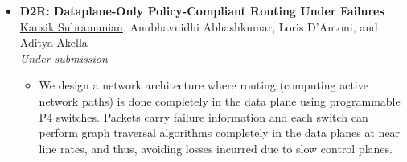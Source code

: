 \documentclass[11pt,a4paper,sans]{moderncv}        %
\begin{document}
\begin{itemize}
	\item \textbf{D2R: Dataplane-Only Policy-Compliant Routing Under Failures} \\
	\underline{Kausik Subramanian}, Anubhavnidhi Abhashkumar, Loris D’Antoni, and Aditya Akella \\
	\emph{Under submission}
	\begin{itemize}
		\item We design a network architecture where routing (computing active
		network paths) is done completely in the data plane using programmable
		P4 switches. Packets carry failure information and each switch can
		perform graph traversal algorithms completely in the data planes at near line 
		rates, and thus, avoiding losses incurred due to slow control planes.
	\end{itemize}
\end{itemize}

\vspace{2pt}
\end{document}

